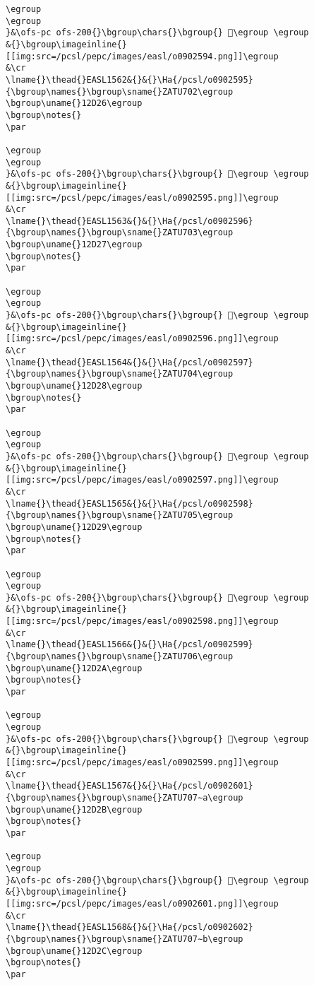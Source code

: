 \begin{verbatim}
\egroup
\egroup
}&\ofs-pc ofs-200{}\bgroup\chars{}\bgroup{} 𒴥\egroup \egroup
&{}\bgroup\imageinline{}[[img:src=/pcsl/pepc/images/easl/o0902594.png]]\egroup
&\cr
\lname{}\thead{}EASL1562&{}&{}\Ha{/pcsl/o0902595}{\bgroup\names{}\bgroup\sname{}ZATU702\egroup
\bgroup\uname{}12D26\egroup
\bgroup\notes{}
\par 

\egroup
\egroup
}&\ofs-pc ofs-200{}\bgroup\chars{}\bgroup{} 𒴦\egroup \egroup
&{}\bgroup\imageinline{}[[img:src=/pcsl/pepc/images/easl/o0902595.png]]\egroup
&\cr
\lname{}\thead{}EASL1563&{}&{}\Ha{/pcsl/o0902596}{\bgroup\names{}\bgroup\sname{}ZATU703\egroup
\bgroup\uname{}12D27\egroup
\bgroup\notes{}
\par 

\egroup
\egroup
}&\ofs-pc ofs-200{}\bgroup\chars{}\bgroup{} 𒴧\egroup \egroup
&{}\bgroup\imageinline{}[[img:src=/pcsl/pepc/images/easl/o0902596.png]]\egroup
&\cr
\lname{}\thead{}EASL1564&{}&{}\Ha{/pcsl/o0902597}{\bgroup\names{}\bgroup\sname{}ZATU704\egroup
\bgroup\uname{}12D28\egroup
\bgroup\notes{}
\par 

\egroup
\egroup
}&\ofs-pc ofs-200{}\bgroup\chars{}\bgroup{} 𒴨\egroup \egroup
&{}\bgroup\imageinline{}[[img:src=/pcsl/pepc/images/easl/o0902597.png]]\egroup
&\cr
\lname{}\thead{}EASL1565&{}&{}\Ha{/pcsl/o0902598}{\bgroup\names{}\bgroup\sname{}ZATU705\egroup
\bgroup\uname{}12D29\egroup
\bgroup\notes{}
\par 

\egroup
\egroup
}&\ofs-pc ofs-200{}\bgroup\chars{}\bgroup{} 𒴩\egroup \egroup
&{}\bgroup\imageinline{}[[img:src=/pcsl/pepc/images/easl/o0902598.png]]\egroup
&\cr
\lname{}\thead{}EASL1566&{}&{}\Ha{/pcsl/o0902599}{\bgroup\names{}\bgroup\sname{}ZATU706\egroup
\bgroup\uname{}12D2A\egroup
\bgroup\notes{}
\par 

\egroup
\egroup
}&\ofs-pc ofs-200{}\bgroup\chars{}\bgroup{} 𒴪\egroup \egroup
&{}\bgroup\imageinline{}[[img:src=/pcsl/pepc/images/easl/o0902599.png]]\egroup
&\cr
\lname{}\thead{}EASL1567&{}&{}\Ha{/pcsl/o0902601}{\bgroup\names{}\bgroup\sname{}ZATU707∼a\egroup
\bgroup\uname{}12D2B\egroup
\bgroup\notes{}
\par 

\egroup
\egroup
}&\ofs-pc ofs-200{}\bgroup\chars{}\bgroup{} 𒴫\egroup \egroup
&{}\bgroup\imageinline{}[[img:src=/pcsl/pepc/images/easl/o0902601.png]]\egroup
&\cr
\lname{}\thead{}EASL1568&{}&{}\Ha{/pcsl/o0902602}{\bgroup\names{}\bgroup\sname{}ZATU707∼b\egroup
\bgroup\uname{}12D2C\egroup
\bgroup\notes{}
\par 


\end{verbatim}
